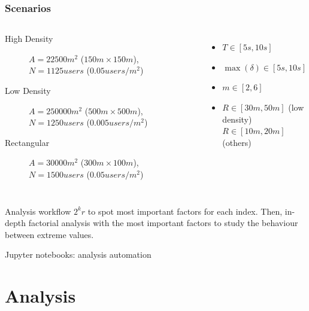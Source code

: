 \documentclass[aspectratio=169]{beamer}
\begin{document}
\begin{frame}
	\frametitle{Scenarios}
	\begin{columns}
		\begin{description}
			\item[High Density] \(A = 22500m^2\) (\(150m \times
				150m\)), \(N = 1125\mathit{users}\) (\(0.05
					\mathit{users}/m^2\))
			\item[Low Density] \(A = 250000m^2\) (\(500m \times
				500m\)), \(N = 1250\mathit{users}\) (\(0.005
					\mathit{users}/m^2\))
			\item[Rectangular] \(A = 30000m^2\) (\(300m \times
				100m\)), \(N = 1500\mathit{users}\) (\(0.05
					\mathit{users}/m^2\))
		\end{description}
		\begin{itemize}
			\item \(T \in [5s, 10s]\)
			\item \(\max(\delta) \in [5s, 10s]\)
			\item \(m \in [2, 6]\)
			\item \(R \in [30m, 50m]\) (low density)\\
				\(R \in [10m, 20m]\) (others)
		\end{itemize}
	\end{columns}
	\begin{block}{Analysis workflow}
		\(2^{k}r\) to spot most important factors for each index. Then,
		in-depth factorial analysis with the most important factors to
		study the behaviour between extreme values.
	\end{block}
	Jupyter notebooks: analysis automation
\end{frame}

\section{Analysis}
\end{document}
